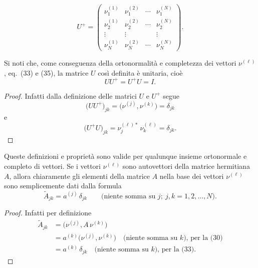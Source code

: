 \documentclass[11pt, a4paper]{book}
\numberwithin{equation}{section}
\begin{document}

\begin{equation}
U^+ =
\begin{pmatrix}
\nu_1^{(1)}  & \nu_1^{(2)}  & \cdots & \nu_1^{(N)}  \\
\nu_2^{(1)}  & \nu_2^{(2)}  & \cdots & \nu_2^{(N)}  \\
\vdots       & \vdots       &        & \vdots       \\
\nu_N^{(1)}  & \nu_N^{(2)}  & \cdots & \nu_N^{(N)}
\end{pmatrix}.
\tag{40b}
\end{equation}

Si noti che, come conseguenza della ortonormalità e completezza dei
vettori $\nu^{(\ell)}$, eq.\ (33) e (35), la matrice $U$ così definita è
unitaria, cioè
\begin{equation}
UU^+ = U^+U = I.
\end{equation}

\begin{proof}
Infatti dalla definizione delle matrici $U$ e $U^+$ segue
\[
\bigl(UU^+\bigr)_{jk} = \bigl(\nu^{(j)}, \nu^{(k)}\bigr) = \delta_{jk}
\]
e
\[
\bigl(U^+U\bigr)_{jk} = \nu_j^{(\ell)*}\,\nu_k^{(\ell)} = \delta_{jk}.
\]
\end{proof}

Queste definizioni e proprietà sono valide per qualunque insieme
ortonormale e completo di vettori. Se i vettori $\nu^{(\ell)}$ sono
autovettori della matrice hermitiana $A$, allora chiaramente gli elementi
della matrice $A$ nella base dei vettori $\nu^{(\ell)}$ sono semplicemente
dati dalla formula
\begin{equation}
\widetilde{A}_{jk} = a^{(j)}\,\delta_{jk}
\qquad \text{(niente somma su }j;\ j,k=1,2,\ldots,N\text{)}.
\end{equation}


\begin{proof}
Infatti per definizione
\begin{align*}
\widetilde{A}_{jk} &= \bigl(\nu^{(j)}, A\,\nu^{(k)}\bigr) \\
  &= a^{(k)}\bigl(\nu^{(j)}, \nu^{(k)}\bigr)
     \quad \text{(niente somma su }k\text{), per la (30)} \\
  &= a^{(k)}\,\delta_{jk}
     \quad \text{(niente somma su }k\text{), per la (33)}.
\end{align*}
\end{proof}
\end{document}
